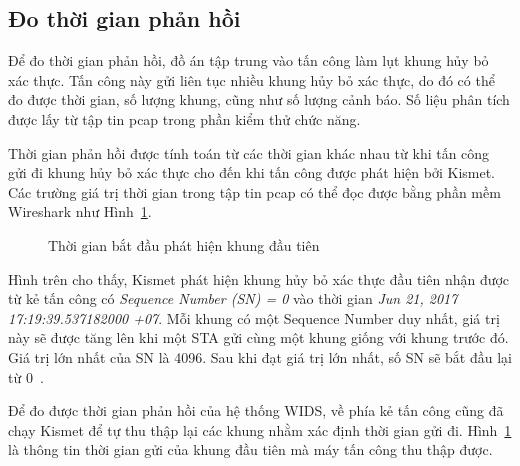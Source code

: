 \subsection{Đo thời gian phản hồi}
Để đo thời gian phản hồi, đồ án tập trung vào tấn công làm lụt khung hủy bỏ xác thực. Tấn công này gửi liên tục nhiều khung hủy bỏ xác thực, do đó có thể đo được thời gian, số lượng khung, cũng như số lượng cảnh báo. Số liệu phân tích được lấy từ tập tin pcap trong phần kiểm thử chức năng.

Thời gian phản hồi được tính toán từ các thời gian khác nhau từ khi tấn công gửi đi khung hủy bỏ xác thực cho đến khi tấn công được phát hiện bởi Kismet. Các trường giá trị thời gian trong tập tin pcap có thể đọc được bằng phần mềm Wireshark như Hình~\ref{fig:deauth-attack-detect}.

\begin{figure}[H]
    \centering
    \caption{
        \label{fig:deauth-attack-detect}
        Thời gian bắt đầu phát hiện khung đầu tiên}
\end{figure}

Hình trên cho thấy, Kismet phát hiện khung hủy bỏ xác thực đầu tiên nhận được từ kẻ tấn công có \emph{Sequence Number (SN) = 0} vào thời gian \emph{Jun 21, 2017 17:19:39.537182000 +07}. Mỗi khung có một Sequence Number duy nhất, giá trị này sẽ được tăng lên khi một STA gửi cùng một khung giống với khung trước đó. Giá trị lớn nhất của SN là 4096. Sau khi đạt giá trị lớn nhất, số SN sẽ bắt đầu lại từ 0~\cite{guo2005sequence}.

Để đo được thời gian phản hồi của hệ thống WIDS, về phía kẻ tấn công cũng đã chạy Kismet để tự thu thập lại các khung nhằm xác định thời gian gửi đi. Hình~\ref{fig:deauth-attack-detect} là thông tin thời gian gửi của khung đầu tiên mà máy tấn công thu thập được.

